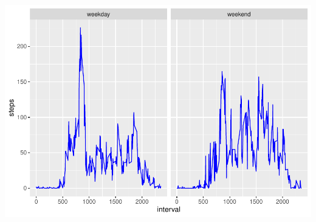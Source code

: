 \documentclass[]{article}
\begin{document}
\includegraphics{PA1_template_files/figure-latex/ploting data to 2 levels-1.pdf}
\end{document}
